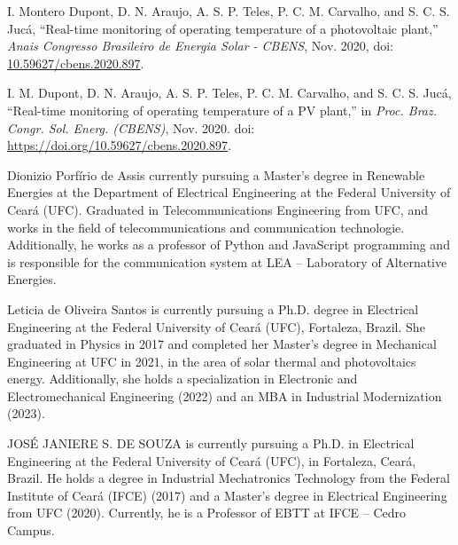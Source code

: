 \documentclass{ieeeaccess}
\begin{document}
\begin{thebibliography}{00}
I. Montero Dupont, D. N. Araujo, A. S. P. Teles, P. C. M. Carvalho, and S. C. S. Jucá, “Real-time monitoring of operating temperature of a photovoltaic plant,” \emph{Anais Congresso Brasileiro de Energia Solar - CBENS}, Nov. 2020, doi: \url{10.59627/cbens.2020.897}.

I. M. Dupont, D. N. Araujo, A. S. P. Teles, P. C. M. Carvalho, and S. C. S. Jucá, “Real-time monitoring of operating temperature of a PV plant,” in \emph{Proc. Braz. Congr. Sol. Energ. (CBENS)}, Nov. 2020. doi: \url{https://doi.org/10.59627/cbens.2020.897}.



\end{thebibliography}

\begin{IEEEbiography}{Dionizio Porfírio de Assis}
currently pursuing a Master's degree in Renewable Energies at the Department of Electrical Engineering at the Federal University of Ceará (UFC). Graduated in Telecommunications Engineering from UFC, and works in the field of telecommunications and communication technologie. Additionally, he works as a professor of Python and JavaScript programming and is responsible for the communication system at LEA – Laboratory of Alternative Energies.
\end{IEEEbiography}

\begin{IEEEbiography}{Leticia de Oliveira Santos} is currently pursuing a Ph.D. degree in Electrical Engineering at the Federal University of Ceará (UFC), Fortaleza, Brazil. She graduated in Physics in 2017 and completed her Master's degree in Mechanical Engineering at UFC in 2021, in the area of solar thermal and photovoltaics energy. Additionally, she holds a specialization in Electronic and Electromechanical Engineering (2022) and an MBA in Industrial Modernization (2023).
\end{IEEEbiography}

\begin{IEEEbiography}{JOSÉ JANIERE S. DE SOUZA} is currently pursuing a Ph.D. in Electrical Engineering at the Federal University of Ceará (UFC), in Fortaleza, Ceará, Brazil. He holds a degree in Industrial Mechatronics Technology from the Federal Institute of Ceará (IFCE) (2017) and a Master’s degree in Electrical Engineering from UFC (2020). Currently, he is a Professor of EBTT at IFCE – Cedro Campus.
\end{IEEEbiography}
\end{document}
